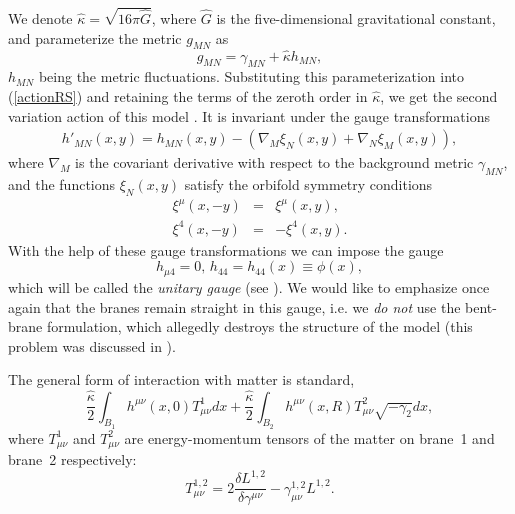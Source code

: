 \documentclass[a4paper,12pt]{article}
\begin{document}
We denote $\hat \kappa = \sqrt{16 \pi \hat G}$, where $\hat G$ is the
five-dimensional gravitational constant, and parameterize the metric
$g_{MN}$ as
\begin{equation}\label{metricpar}
  g_{MN} = \gamma_{MN} + \hat \kappa h_{MN},
\end{equation}
$h_{MN}$ being the metric fluctuations. Substituting this parameterization
into (\ref{actionRS}) and retaining the terms of the zeroth order in $\hat \kappa$,
we get the second variation action of this model  \cite{BKSV}. It  is invariant
under the gauge transformations
\begin{eqnarray}\label{gaugetrRS}
h'_{MN}(x,y) = h_{MN}(x,y) -(\nabla_M\xi_N(x,y) + \nabla_N\xi_M(x,y) ),
\end{eqnarray}
where $\nabla_M$ is the covariant derivative with respect to the
background metric $\gamma_{MN}$, and the functions $\xi_N(x,y)$
satisfy the orbifold symmetry conditions
\begin{eqnarray}\label{orbifoldsym1}
\xi^{\mu}\left(x,-y\right)&=&\xi^{\mu}\left(x,y\right),\\
\nonumber \xi^{4}\left(x,-y\right)&=&-\xi^{4}\left(x,y\right).
\nonumber
\end{eqnarray}
With the help of these gauge transformations we can impose the
gauge
\begin{equation}\label{unitgauge}
h_{\mu4} =0, \, h_{44} = h_{44}(x) \equiv \phi (x),
\end{equation}
which  will be called the {\it unitary gauge} (see \cite{BKSV}). We would
like to emphasize once again that the branes remain straight in this gauge,
i.e. we {\it do not} use the bent-brane formulation, which allegedly
destroys the structure of the model (this problem was discussed in
\cite{AIMVV}).

The general form of interaction with matter is standard,
\begin{equation}\label{interaction}
 \frac{\hat \kappa}{2} \int_{B_1} h^{\mu\nu}(x,0) T^1_{\mu\nu} dx +
  \frac{\hat \kappa}{2} \int_{B_2} h^{\mu\nu}(x,R) T^2_{\mu\nu} \sqrt{- \gamma_2} dx,
\end{equation}
where $ T^1_{\mu\nu}$ and $ T^2_{\mu\nu}$ are energy-momentum
tensors of the matter on brane~1 and brane~2 respectively:
$$
 T^{1,2}_{\mu\nu} = 2\frac{\delta L^{1,2}}{\delta  \gamma^{\mu\nu}} -
  \gamma^{1,2}_{\mu\nu}  L^{1,2}.
$$
\end{document}
